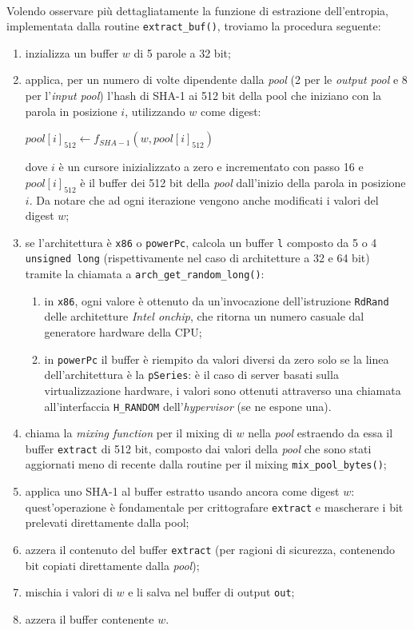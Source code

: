 \documentclass{article}
\begin{document}
 \paragraph{} Volendo osservare più dettagliatamente la funzione di estrazione
 dell'entropia, implementata dalla routine
 \verb+extract_buf()+, troviamo la procedura seguente:
 \begin{enumerate}
   \item inzializza un buffer $w$ di 5 parole a 32 bit;
   \item applica, per un numero di volte dipendente dalla \emph{pool} (2 per le
   \emph{output pool} e 8 per l'\emph{input pool})  l'hash di SHA-1 ai 512 bit
   della pool che iniziano con la parola in posizione $i$, utilizzando $w$ come
   digest:
   \begin{center}
   $pool\left[i\right]_{512}\leftarrow f_{SHA-1}(w, pool\left[i\right]_{512})$
   \end{center}
   dove $i$ è un cursore inizializzato a zero e incrementato con passo 16 e
   $pool\left[i\right]_{512}$ è il buffer dei 512 bit della \emph{pool}
   dall'inizio della parola in posizione $i$. Da notare che ad ogni iterazione
   vengono anche modificati i valori del digest $w$; 
   \item se l'architettura è \verb+x86+ o \verb+powerPc+, calcola un buffer
   \verb+l+ composto da 5 o 4 \verb+unsigned long+ (rispettivamente nel caso di
   architetture a 32 e 64 bit) tramite la chiamata a
   \verb+arch_get_random_long()+:
   \begin{enumerate}
     \item in \verb+x86+, ogni valore è ottenuto da un'invocazione
     dell'istruzione \verb+RdRand+ delle architetture \emph{Intel onchip}, che
     ritorna un numero casuale dal generatore hardware della
     CPU;\label{rdrandPoint}
     \item in \verb+powerPc+ il buffer è riempito da valori diversi da zero 
     solo se la linea dell'architettura è la \verb+pSeries+: è il
     caso di server basati sulla virtualizzazione hardware, i valori sono
     ottenuti attraverso una chiamata all'interfaccia \verb+H_RANDOM+
     dell'\emph{hypervisor} (se ne espone una).
   \end{enumerate} 
   \item chiama la \emph{mixing function} per il mixing di $w$ nella
   \emph{pool} estraendo da essa il buffer \verb+extract+ di 512 bit, composto
   dai valori della \emph{pool} che sono stati aggiornati meno di recente dalla
   routine per il mixing \verb+mix_pool_bytes()+;
   \item applica uno SHA-1 al buffer estratto usando ancora come digest $w$:
   quest'operazione è fondamentale per crittografare \verb+extract+ e mascherare i
   bit prelevati direttamente dalla pool;
   \item azzera il contenuto del buffer \verb+extract+ (per ragioni di sicurezza,
   contenendo bit copiati direttamente dalla \emph{pool});
   \item mischia i valori di $w$ e li salva nel buffer di output \verb+out+;
   \item azzera il buffer contenente $w$.
 \end{enumerate}
 
\end{document}

